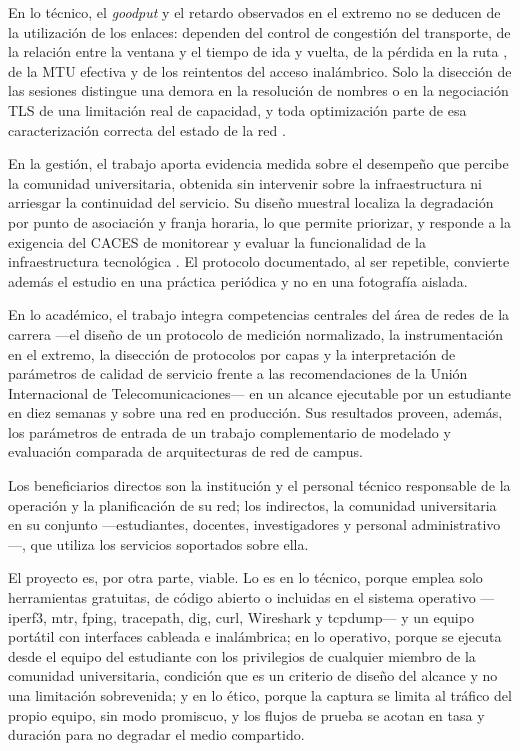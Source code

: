 En lo técnico, el \textit{goodput} y el retardo observados en el extremo no se deducen de la utilización de los enlaces: dependen del control de congestión del transporte, de la relación entre la ventana y el tiempo de ida y vuelta, de la pérdida en la ruta \cite{rfc6349}, de la MTU efectiva y de los reintentos del acceso inalámbrico. Solo la disección de las sesiones distingue una demora en la resolución de nombres o en la negociación TLS de una limitación real de capacidad, y toda optimización parte de esa caracterización correcta del estado de la red \cite{oppenheimer2011topdown}.

En la gestión, el trabajo aporta evidencia medida sobre el desempeño que percibe la comunidad universitaria, obtenida sin intervenir sobre la infraestructura ni arriesgar la continuidad del servicio. Su diseño muestral localiza la degradación por punto de asociación y franja horaria, lo que permite priorizar, y responde a la exigencia del CACES de monitorear y evaluar la funcionalidad de la infraestructura tecnológica \cite{caces2023modelo}. El protocolo documentado, al ser repetible, convierte además el estudio en una práctica periódica y no en una fotografía aislada.

En lo académico, el trabajo integra competencias centrales del área de redes de la carrera ---el diseño de un protocolo de medición normalizado, la instrumentación en el extremo, la disección de protocolos por capas y la interpretación de parámetros de calidad de servicio frente a las recomendaciones de la Unión Internacional de Telecomunicaciones--- en un alcance ejecutable por un estudiante en diez semanas y sobre una red en producción. Sus resultados proveen, además, los parámetros de entrada de un trabajo complementario de modelado y evaluación comparada de arquitecturas de red de campus.

Los beneficiarios directos son la institución y el personal técnico responsable de la operación y la planificación de su red; los indirectos, la comunidad universitaria en su conjunto ---estudiantes, docentes, investigadores y personal administrativo---, que utiliza los servicios soportados sobre ella.

El proyecto es, por otra parte, viable. Lo es en lo técnico, porque emplea solo herramientas gratuitas, de código abierto o incluidas en el sistema operativo ---iperf3, mtr, fping, tracepath, dig, curl, Wireshark y tcpdump--- y un equipo portátil con interfaces cableada e inalámbrica; en lo operativo, porque se ejecuta desde el equipo del estudiante con los privilegios de cualquier miembro de la comunidad universitaria, condición que es un criterio de diseño del alcance y no una limitación sobrevenida; y en lo ético, porque la captura se limita al tráfico del propio equipo, sin modo promiscuo, y los flujos de prueba se acotan en tasa y duración para no degradar el medio compartido.

